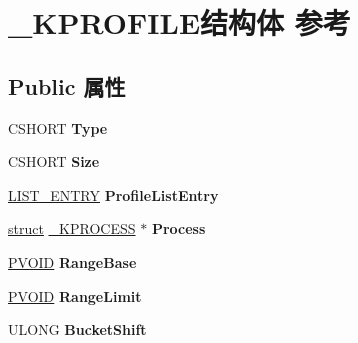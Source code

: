 \hypertarget{struct___k_p_r_o_f_i_l_e}{}\section{\+\_\+\+K\+P\+R\+O\+F\+I\+L\+E结构体 参考}
\label{struct___k_p_r_o_f_i_l_e}
\subsection*{Public 属性}
\begin{DoxyCompactItemize}
\item 
\mbox{\label{struct___k_p_r_o_f_i_l_e_a99a614eef1ba7c5b05fb5e841cec2fa5}} 
C\+S\+H\+O\+RT {\bfseries Type}
\item 
\mbox{\label{struct___k_p_r_o_f_i_l_e_a14be23884b982acec6832e4b1861daa5}} 
C\+S\+H\+O\+RT {\bfseries Size}
\item 
\mbox{\label{struct___k_p_r_o_f_i_l_e_af337c5a929ecad12231c18d4f53aa3e5}} 
\hyperlink{struct___l_i_s_t___e_n_t_r_y}{L\+I\+S\+T\+\_\+\+E\+N\+T\+RY} {\bfseries Profile\+List\+Entry}
\item 
\mbox{\label{struct___k_p_r_o_f_i_l_e_a0d30b6eb71e1e47ad47da94cb23aafa8}} 
\hyperlink{interfacestruct}{struct} \hyperlink{struct___k_p_r_o_c_e_s_s}{\+\_\+\+K\+P\+R\+O\+C\+E\+SS} $\ast$ {\bfseries Process}
\item 
\mbox{\label{struct___k_p_r_o_f_i_l_e_a7e2b3f16d59d9c687fe190fcf42e8cf5}} 
\hyperlink{interfacevoid}{P\+V\+O\+ID} {\bfseries Range\+Base}
\item 
\mbox{\label{struct___k_p_r_o_f_i_l_e_a2234ca92b906825000b8489cd61b87f1}} 
\hyperlink{interfacevoid}{P\+V\+O\+ID} {\bfseries Range\+Limit}
\item 
\mbox{\label{struct___k_p_r_o_f_i_l_e_a209ebf7460b3df48459d17e184bc0b50}} 
U\+L\+O\+NG {\bfseries Bucket\+Shift}
\item 
\mbox{\label{struct___k_p_r_o_f_i_l_e_a3790475d606aaf62854f890ba268bd77}} 

\end{DoxyCompactItemize}
